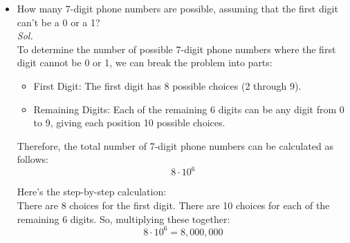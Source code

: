 \documentclass{book}
\begin{document}
\begin{enumerate}
\begin{itemize}
		      \item How many 7-digit phone numbers are possible, assuming
		            that the first digit can’t be a 0 or a 1?\\
		            \textit{ Sol. }\\
		            To determine the number of possible 7-digit phone numbers where the first digit cannot be 0 or 1, we can break the problem into parts:\\
		            \begin{itemize}
			            \item First Digit: The first digit has 8 possible choices (2 through 9).
			            \item Remaining Digits: Each of the remaining 6 digits can be any digit from 0 to 9, giving each position 10 possible choices.
		            \end{itemize}

		            Therefore, the total number of 7-digit phone numbers can be calculated as follows:\\
		            \[
			            8 \cdot 10^6
		            \]

		            Here's the step-by-step calculation:\\
		            There are 8 choices for the first digit.
		            There are 10 choices for each of the remaining 6 digits.
		            So, multiplying these together:
		            \[
			            8\cdot10^6=8,000,000
		            \]


\end{itemize}
\end{enumerate}
\end{document}
